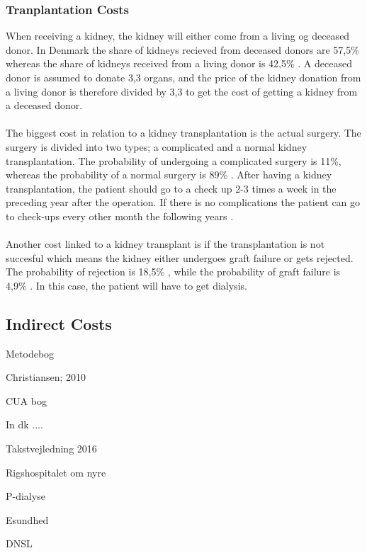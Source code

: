 \documentclass[a4paper,12pt]{article}
\begin{document}
\subsubsection*{Tranplantation Costs}

When receiving a kidney, the kidney will either come from a living og deceased donor. In Denmark the share of kidneys recieved from deceased donors are 57,5\% whereas the share of kidneys received from a living donor is  42,5\% \cite{DNSL}. A deceased donor is assumed to donate 3,3 organs, and the price of the kidney donation from a living donor  is therefore divided by 3,3 to get the cost of getting a kidney from a deceased donor. 
\\\\
The biggest cost in relation to a kidney  transplantation is the actual surgery. The surgery is divided into two types; a complicated and a normal kidney transplantation. The probability of undergoing a complicated surgery is 11\%, whereas the probability of a normal surgery is 89\% \cite{esundhed} \cite{CUAdkartikel}. After having a kidney transplantation, the patient should go to a check up 2-3 times a week in the preceding year after the operation. If there is no complications the patient can go to check-ups every other month the following years \cite{Rigshospitalet}. 
\\\\
Another cost linked to a kidney transplant is if the transplantation is not succesful which means the kidney either undergoes graft failure or gets rejected. The probability of rejection is 18,5\% \cite{Rigshospitalet}, while the probability of graft failure is 4,9\% \cite{DNSL}. In this case, the patient will have to get dialysis.

\subsection{Indirect Costs}


\newpage
\begin{thebibliography}{9}

Metodebog

Christiansen; 2010

CUA bog

In dk .... 

Takstvejledning 2016

Rigshospitalet om nyre

P-dialyse

Esundhed

DNSL

\end{thebibliography}	
	
\end{document}
